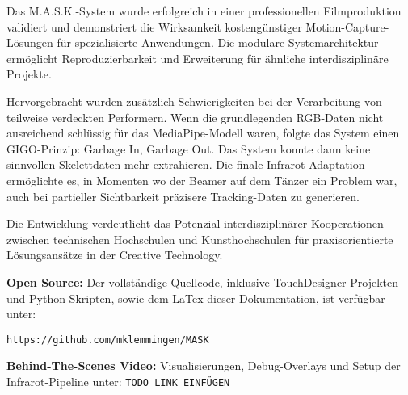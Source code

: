 Das M.A.S.K.-System wurde erfolgreich in einer professionellen Filmproduktion validiert und demonstriert die Wirksamkeit kostengünstiger Motion-Capture-Lösungen für spezialisierte Anwendungen. Die modulare Systemarchitektur ermöglicht Reproduzierbarkeit und Erweiterung für ähnliche interdisziplinäre Projekte.

Hervorgebracht wurden zusätzlich Schwierigkeiten bei der Verarbeitung von teilweise verdeckten Performern. Wenn die grundlegenden RGB-Daten nicht ausreichend schlüssig für das MediaPipe-Modell waren, folgte das System einen GIGO-Prinzip: Garbage In, Garbage Out. Das System konnte dann keine sinnvollen Skelettdaten mehr extrahieren. Die finale Infrarot-Adaptation ermöglichte es, in Momenten wo der Beamer auf dem Tänzer ein Problem war, auch bei partieller Sichtbarkeit präzisere Tracking-Daten zu generieren.

Die Entwicklung verdeutlicht das Potenzial interdisziplinärer Kooperationen zwischen technischen Hochschulen und Kunsthochschulen für praxisorientierte Lösungsansätze in der Creative Technology.

\textbf{Open Source:} Der vollständige Quellcode, inklusive TouchDesigner-Projekten und Python-Skripten, sowie dem LaTex dieser Dokumentation, ist verfügbar unter:

\texttt{https://github.com/mklemmingen/MASK}

\textbf{Behind-The-Scenes Video:} Visualisierungen, Debug-Overlays und Setup der Infrarot-Pipeline unter: \texttt{TODO LINK EINFÜGEN}